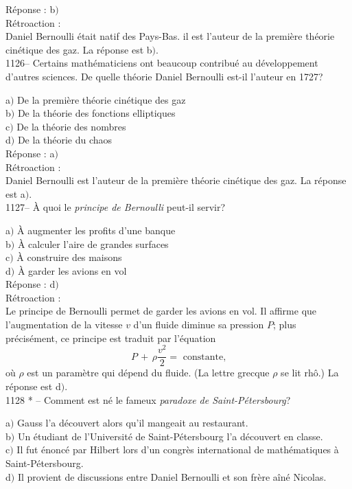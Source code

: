 ﻿\documentclass[letterpaper, 12pt]{article}
\begin{document}
R\'eponse : b$)$\\

R\'etroaction : \\
Daniel Bernoulli \'etait natif des Pays-Bas. il est l'auteur de la
premi\`ere th\'eorie cin\'etique des gaz.
La r\'eponse est b$)$.\\

1126-- Certains math\'ematiciens ont beaucoup contribu\'e au
d\'eveloppement d'autres sciences. De quelle th\'eorie Daniel
Bernoulli est-il l'auteur en 1727?

a$)$ De la premi\`ere th\'eorie cin\'etique des gaz \\
b$)$ De la th\'eorie des fonctions elliptiques \\
c$)$ De la th\'eorie des nombres \\
d$)$ De la th\'eorie du chaos\\

R\'eponse : a$)$\\

R\'etroaction : \\
Daniel Bernoulli est l'auteur de la premi\`ere th\'eorie cin\'etique
des gaz.
La r\'eponse est a$)$.\\

1127-- \`A quoi le {\sl principe de Bernoulli} peut-il servir?

a$)$ \`A augmenter les profits d'une banque \\
b$)$ \`A calculer l'aire de grandes surfaces \\
c$)$ \`A construire des maisons \\
d$)$ \`A garder les avions en vol \\

R\'eponse : d$)$\\

R\'etroaction : \\
Le principe de Bernoulli permet de garder les avions en vol. Il
affirme que l'augmentation de la vitesse $v$ d'un fluide diminue sa
pression $P$; plus pr\'ecis\'ement, ce principe est traduit par
l'\'equation
$$\displaystyle{P\,+\,\rho\frac{v^2}2= \text{ constante,}}$$
o\`u $\rho$ est un param\`etre qui d\'epend du fluide. (La lettre
grecque $\rho$ se lit rh\^o.)
La r\'eponse est d$)$.\\

1128 * -- Comment est n\'e le fameux {\sl paradoxe de
Saint-P\'etersbourg}?

a$)$ Gauss l'a d\'ecouvert alors qu'il mangeait au restaurant. \\
b$)$ Un \'etudiant de l'Universit\'e de Saint-P\'etersbourg l'a d\'ecouvert
en classe. \\
c$)$ Il fut \'enonc\'e par Hilbert lors d'un congr\`es international de
math\'ematiques \`a Saint-P\'etersbourg.\\
d$)$ Il provient de discussions entre Daniel Bernoulli et son fr\`ere
a\^in\'e Nicolas.\\
\end{document}
